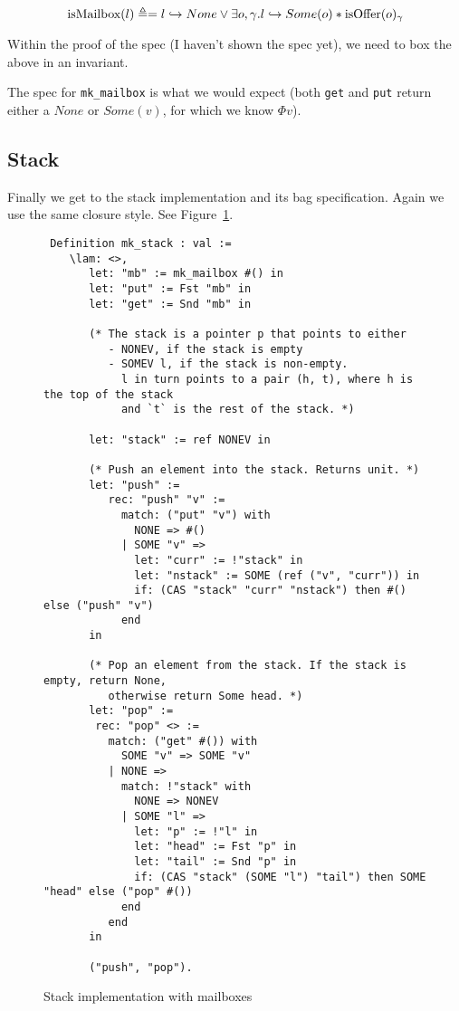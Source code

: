 \[
\text{isMailbox}(l) \triangleq = l \hookrightarrow None \lor \exists o, \gamma. l \hookrightarrow Some(o) * \text{isOffer}(o)_{\gamma}
\]

Within the proof of the spec (I haven't shown the spec yet), we need to box the above in an invariant.

The spec for \texttt{mk\_mailbox} is what we would expect (both \texttt{get} and \texttt{put} return either a $None$ or $Some(v)$, for which we know $\Phi v$). 

\subsection{Stack}

Finally we get to the stack implementation and its bag specification. Again we use the same closure style. See Figure~\ref{figure:stack-code}.

\begin{figure}
\begin{verbatim}
 Definition mk_stack : val :=
    \lam: <>,
       let: "mb" := mk_mailbox #() in
       let: "put" := Fst "mb" in
       let: "get" := Snd "mb" in

       (* The stack is a pointer p that points to either
          - NONEV, if the stack is empty
          - SOMEV l, if the stack is non-empty.
            l in turn points to a pair (h, t), where h is the top of the stack
            and `t` is the rest of the stack. *)
       
       let: "stack" := ref NONEV in

       (* Push an element into the stack. Returns unit. *)
       let: "push" :=
          rec: "push" "v" :=
            match: ("put" "v") with
              NONE => #()
            | SOME "v" =>
              let: "curr" := !"stack" in
              let: "nstack" := SOME (ref ("v", "curr")) in
              if: (CAS "stack" "curr" "nstack") then #() else ("push" "v")
            end
       in

       (* Pop an element from the stack. If the stack is empty, return None,
          otherwise return Some head. *)
       let: "pop" :=
        rec: "pop" <> :=
          match: ("get" #()) with
            SOME "v" => SOME "v"
          | NONE =>
            match: !"stack" with
              NONE => NONEV
            | SOME "l" =>
              let: "p" := !"l" in
              let: "head" := Fst "p" in
              let: "tail" := Snd "p" in
              if: (CAS "stack" (SOME "l") "tail") then SOME "head" else ("pop" #())
            end
          end
       in

       ("push", "pop").
\end{verbatim}
\caption{Stack implementation with mailboxes}
\label{figure:stack-code}
\end{figure}